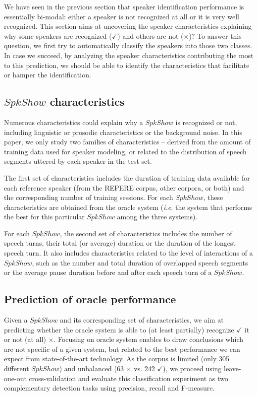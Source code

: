 We have seen in the previous section that speaker identification performance is essentially bi-modal: either a speaker is not recognized at all or it is very well recognized. This section aims at uncovering the speaker characteristics explaining why some speakers are recognized ($\checkmark$) and others are not ($\times$)? To answer this question, we first try to automatically classify the speakers into those two classes. In case we succeed, by analyzing the speaker characteristics contributing the most to this prediction, we should be able to identify the characteristics that facilitate or hamper the identification.

\subsection{$SpkShow$ characteristics}

Numerous characteristics could explain why a $SpkShow$ is recognized or not, including linguistic or prosodic characteristics or the background noise. In this paper, we only study two families of characteristics -- derived from the amount of training data used for speaker modeling, or related to the distribution of speech segments uttered by each speaker in the test set. 

The first set of characteristics includes the duration of training data available for each reference speaker (from the REPERE corpus, other corpora, or both) and the corresponding number of training sessions. For each $SpkShow$, these characteristics are obtained from the oracle system (\emph{i.e.} the system that performs the best for this particular $SpkShow$ among the three systems).

For each $SpkShow$, the second set of characteristics includes the number of speech turns, their total (or average) duration or the duration of the longest speech turn. It also includes characteristics related to the level of interactions of a $SpkShow$, such as the number and total duration of overlapped speech segments or the average pause duration before and after each speech turn of a $SpkShow$.

\subsection{Prediction of oracle performance}

Given a $SpkShow$ and its corresponding set of characteristics, we aim at predicting whether the oracle system is able to (at least partially) recognize $\checkmark$ it or not (at all) $\times$.  Focusing on oracle system enables to draw conclusions which are not specific of a given system, but related to the best performance we can expect from state-of-the-art technology.
As the corpus is limited (only 305 different $SpkShow$) and unbalanced (63 $\times$ vs. 242 $\checkmark$), we proceed using leave-one-out cross-validation and evaluate this classification experiment as two complementary detection tasks using precision, recall and F-measure.

